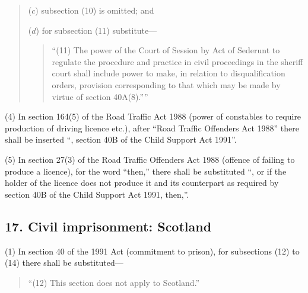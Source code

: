 \documentclass[12pt,a4paper]{article}
\begin{document}
\begin{quotation}
\begin{enumerate}
($c$) subsection (10)  is omitted; and

($d$) for subsection (11)  substitute—
\begin{quotation}
“(11) The power of the Court of Session by Act of Sederunt to regulate the procedure and practice in civil proceedings in the sheriff court shall include power to make, in relation to disqualification orders, provision corresponding to that which may be made by virtue of section 40A(8).””
\end{quotation}
\end{enumerate}
\end{quotation}

(4) In section 164(5)  of the Road Traffic Act 1988 (power of constables to require production of driving licence etc.), after “Road Traffic Offenders Act 1988” there shall be inserted “, section 40B of the Child Support Act 1991”.

(5) In section 27(3)  of the Road Traffic Offenders Act 1988 (offence of failing to produce a licence), for the word “then,” there shall be substituted “, or if the holder of the licence does not produce it and its counterpart as required by section 40B of the Child Support Act 1991, then,”.

\subsection{17. Civil imprisonment: Scotland}

(1) In section 40 of the 1991 Act (commitment to prison), for subsections (12)  to (14)  there shall be substituted—
\begin{quotation}
“(12) This section does not apply to Scotland.”
\end{quotation}
\end{document}

